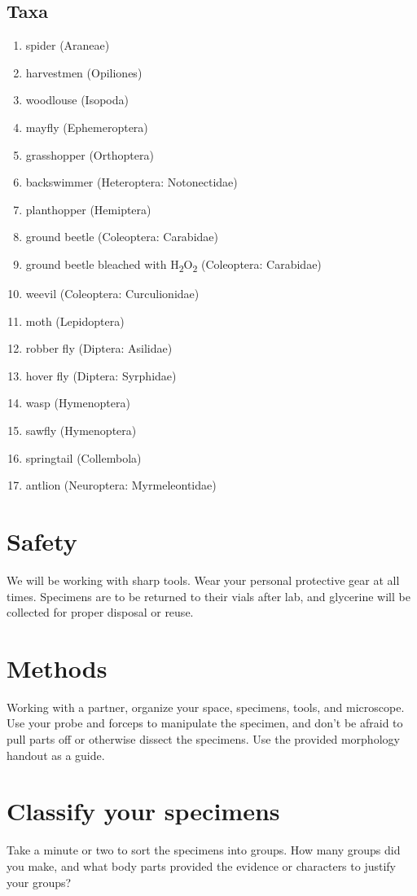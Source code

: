 \documentclass[letterpaper, 11pt]{article}
\begin{document}
\subsection*{Taxa}
\begin{enumerate}
	\item {spider (Araneae)}
	\item {harvestmen (Opiliones)}
	\item {woodlouse (Isopoda)}
	\item {mayfly (Ephemeroptera)}
	\item {grasshopper (Orthoptera)}
	\item {backswimmer (Heteroptera: Notonectidae)}
	\item {planthopper (Hemiptera)}
	\item {ground beetle (Coleoptera: Carabidae)}
	\item {ground beetle bleached with H\textsubscript{2}O\textsubscript{2} (Coleoptera: Carabidae)}
	\item {weevil (Coleoptera: Curculionidae)}
	\item {moth (Lepidoptera)}
	\item {robber fly (Diptera: Asilidae)}
	\item {hover fly (Diptera: Syrphidae)}
	\item {wasp (Hymenoptera)}
	\item {sawfly (Hymenoptera)}
	\item {springtail (Collembola)}
	\item {antlion (Neuroptera: Myrmeleontidae)}
\end{enumerate}

\section*{Safety}
We will be working with sharp tools. Wear your personal protective gear at all times. Specimens are to be returned to their vials after lab, and glycerine will be collected for proper disposal or reuse.

\section*{Methods}
Working with a partner, organize your space, specimens, tools, and microscope. Use your probe and forceps to manipulate the specimen, and don't be afraid to pull parts off or otherwise dissect the specimens. Use the provided morphology handout as a guide.

\section*{Classify your specimens}
Take a minute or two to sort the specimens into groups. How many groups did you make, and what body parts provided the evidence or characters to justify your groups?
\vspace{30 mm}
\end{document}
